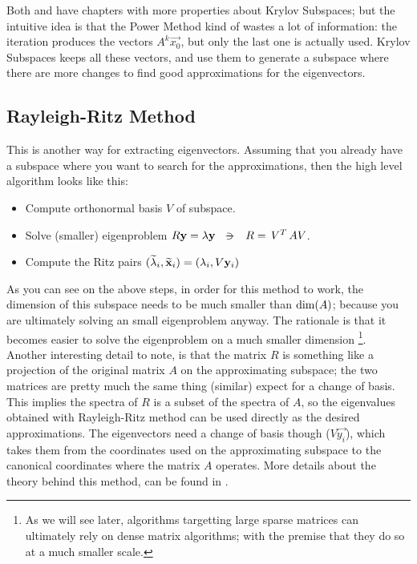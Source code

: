 Both \cite{parlett80} and \cite{saad92} have chapters with more
properties about Krylov Subspaces; but the intuitive idea is that the
Power Method kind of wastes a lot of information: the iteration
produces the vectors $A^k\vec{x_0}$, but only the last one is actually
used. Krylov Subspaces keeps all these vectors, and use them to
generate a subspace where there are more changes to find good
approximations for the eigenvectors.

\subsection{Rayleigh-Ritz Method}

This is another way for extracting eigenvectors. Assuming that you
already have a subspace where you want to search for the
approximations, then the high level algorithm looks like this:

\begin{itemize}
  \item Compute orthonormal basis $V$ of subspace. 
  \item Solve (smaller) eigenproblem $R\vec{y} = \lambda\vec{y}
    \ds{\suchthat} R = \trans{V} A V$. 
  \item Compute the Ritz pairs
      $(\widetilde{\lambda}_i,\widetilde{\mathbf{x}}_i) = (\lambda_i, V\mathbf{y}_i)$
\end{itemize}

As you can see on the above steps, in order for this method to work,
the dimension of this subspace  needs to be much smaller than
$\operatorname{dim}(A)$; because you are ultimately solving an small
eigenproblem anyway.  The rationale is that it becomes easier to
solve the eigenproblem on a much smaller dimension \footnote{As we
  will see later, algorithms targetting large sparse matrices can
  ultimately rely on dense matrix algorithms; with the premise that
  they do so at a much smaller scale.}. \\

Another interesting detail to note, is that the
matrix $R$ is something like a projection of the original matrix $A$
on the approximating subspace; the two matrices are pretty much the
same thing (similar) expect for a change of 
basis. This implies the spectra of $R$ is a subset of the spectra of
$A$, so the eigenvalues obtained with Rayleigh-Ritz method can be used
directly as the desired approximations. The eigenvectors need a change
of basis though ($V\vec{y_i}$), which takes them from the coordinates
used on the approximating subspace to the canonical coordinates where
the matrix $A$ operates. More details about the theory behind this
method, can be found in \cite{saad92}.

